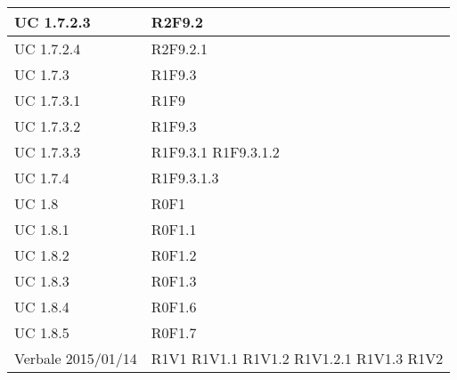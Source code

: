 \begin{center}
\begin{longtable}{| p{4cm} | p{4cm} |}
		UC 1.7.2.3  &  R2F9.2 \\
		\hline
		UC 1.7.2.4  &  R2F9.2.1 \\
		\hline
		UC 1.7.3  &  R1F9.3 \\
		\hline
		UC 1.7.3.1  &  R1F9 \\
		\hline
		UC 1.7.3.2  &  R1F9.3 \\
		\hline
		UC 1.7.3.3  &  R1F9.3.1 \newline R1F9.3.1.2 \\
		\hline
		UC 1.7.4  &  R1F9.3.1.3 \\
		\hline
		UC 1.8  &  R0F1 \\
		\hline
		UC 1.8.1  &  R0F1.1 \\
		\hline
		UC 1.8.2  &  R0F1.2 \\
		\hline
		UC 1.8.3  &  R0F1.3 \\
		\hline
		UC 1.8.4  &  R0F1.6 \\
		\hline
		UC 1.8.5  &  R0F1.7 \\
		\hline
		Verbale 2015/01/14  &  R1V1 \newline R1V1.1 \newline R1V1.2 \newline R1V1.2.1 \newline R1V1.3 \newline R1V2 \\
		\hline

	\end{longtable}
	\egroup
	\end{center}


